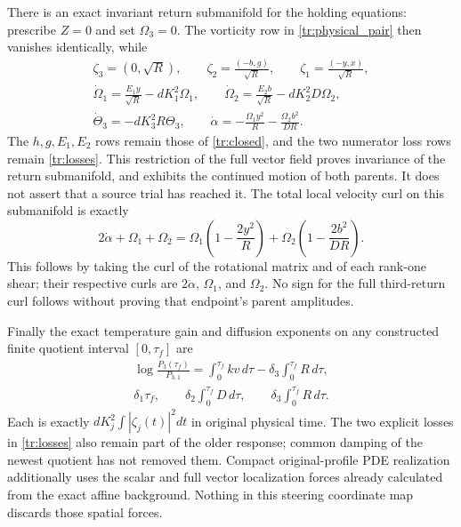 There is an exact invariant return submanifold for the holding
equations: prescribe $Z=0$ and set $\Omega_3=0$. The vorticity
row in \eqref{tr:physical_pair} then vanishes identically, while
\begin{equation}\label{tr:hold}
 \begin{gathered}
 \zeta_3=(0,\sqrt R),\qquad
 \zeta_2=\frac{(-b,g)}{\sqrt R},\qquad
 \zeta_1=\frac{(-y,x)}{\sqrt R},\\
 \dot\Omega_1=\frac{E_1y}{\sqrt R}-dK_1^2\Omega_1,\qquad
 \dot\Omega_2=\frac{E_2b}{\sqrt R}-dK_2^2D\Omega_2,\\
 \dot\Theta_3=-dK_3^2R\Theta_3,\qquad
 \dot\alpha=-\frac{\Omega_1y^2}{R}
                 -\frac{\Omega_2b^2}{DR}.
 \end{gathered}
\end{equation}
The $h,g,E_1,E_2$ rows remain those of \eqref{tr:closed}, and
the two numerator loss rows remain \eqref{tr:losses}. This
restriction of the full vector field proves invariance of the
return submanifold, and exhibits the continued motion of both
parents. It does not assert that a source trial has reached it.
The total local velocity curl on this submanifold is exactly
\begin{equation}\label{tr:origin_curl}
 2\dot\alpha+\Omega_1+\Omega_2
 =\Omega_1\left(1-\frac{2y^2}{R}\right)
  +\Omega_2\left(1-\frac{2b^2}{DR}\right).
\end{equation}
This follows by taking the curl of the rotational matrix and of
each rank-one shear; their respective curls are $2\dot\alpha$,
$\Omega_1$, and $\Omega_2$. No sign for the full third-return
curl follows without proving that endpoint's parent amplitudes.

Finally the exact temperature gain and diffusion exponents on any
constructed finite quotient interval $[0,\tau_f]$ are
\begin{equation}\label{tr:costs}
 \begin{gathered}
 \log\frac{P_3(\tau_f)}{P_{3,1}}
 =\int_0^{\tau_f}kv\,d\tau
          -\delta_3\int_0^{\tau_f}R\,d\tau,\\
 \delta_1\tau_f,\qquad
 \delta_2\int_0^{\tau_f}D\,d\tau,\qquad
 \delta_3\int_0^{\tau_f}R\,d\tau.
 \end{gathered}
\end{equation}
Each is exactly $dK_j^2\int|\zeta_j(t)|^2dt$ in original
physical time. The two explicit losses in \eqref{tr:losses}
also remain part of the older response; common damping of the
newest quotient has not removed them. Compact original-profile
PDE realization additionally uses the scalar and full vector
localization forces already calculated from the exact affine
background. Nothing in this steering coordinate map discards
those spatial forces.
